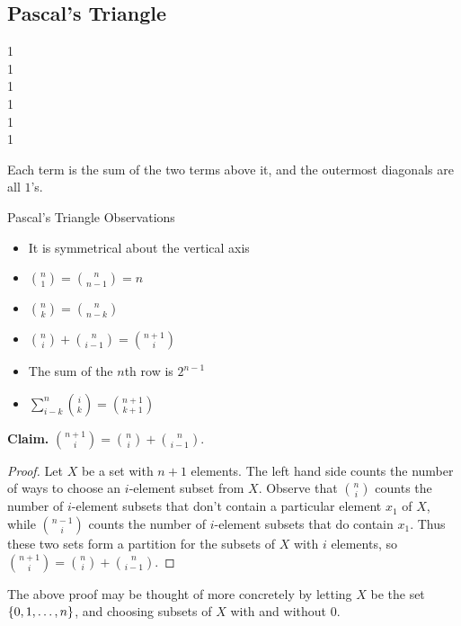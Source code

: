 \documentclass[class=article, crop=false]{standalone}
\begin{document}
  \subsection{Pascal's Triangle}
  \begin{center}
    1\\
    1\\
    1\\
    1\\
    1\\
    1
  \end{center}
  Each term is the sum of the two terms above it, and the outermost diagonals are all $1$'s.
  \begin{note}{Pascal's Triangle Observations}
    \begin{itemize}
      \item It is symmetrical about the vertical axis
      \item $\binom{n}{1}=\binom{n}{n-1}=n$
      \item $\binom{n}{k}=\binom{n}{n-k}$
      \item $\binom{n}{i} + \binom{n}{i-1} = \binom{n+1}{i}$
      \item The sum of the $n$th row is $2^{n-1}$
      \item $\sum_{i-k}^n \binom{i}{k} = \binom{n+1}{k+1}$
    \end{itemize}
  \end{note}
  \textbf{Claim.} $\binom{n+1}{i}=\binom{n}{i}+\binom{n}{i-1}$.
  \begin{proof}
    Let $X$ be a set with $n+1$ elements. The left hand side counts the number of ways to choose an $i$-element subset from $X$. Observe that $\binom{n}{i}$ counts the number of $i$-element subsets that don't contain a particular element $x_1$ of $X$, while $\binom{n-1}{i}$ counts the number of $i$-element subsets that do contain $x_1$. Thus these two sets form a partition for the subsets of $X$ with $i$ elements, so $\binom{n+1}{i}=\binom{n}{i}+\binom{n}{i-1}$.
  \end{proof}
  \begin{note}{}
    The above proof may be thought of more concretely by letting $X$ be the set $\left\{0, 1, \dotsc, n\right\}$, and choosing subsets of $X$ with and without $0$.
  \end{note}
\end{document}

